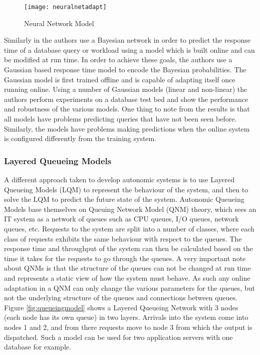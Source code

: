 \begin{figure}
	\centering
		\texttt{[image: neuralnetadapt]}
	\caption{Neural Network Model}
	\label{fig:neuralnet}
\end{figure}

Similarly in \cite{related:bayesiandb} the authors use a Bayesian network in order to predict the response time of a database query or workload using a model which is built online and can be modified at run time. In order to achieve these goals, the authors use a Gaussian based response time model to encode the Bayesian probabilities. The Gaussian model is first trained offline and is capable of adapting itself once running online. Using a number of Gaussian models (linear and non-linear) the authors perform experiments on a database test bed and show the performance and robustness of the various models. One thing to note from the results is that all models have problems predicting queries that have not been seen before. Similarly, the models have problems making predictions when the online system is configured differently from the training system. 

\subsubsection{Layered Queueing Models}

A different approach taken to develop autonomic systems is to use Layered Queueing Models (LQM) to represent the behaviour of the system, and then to solve the LQM to predict the future state of the system. Autonomic Queueing Models base themselves on Queuing Network Model (QNM) theory, which sees an IT system as a network of queues such as CPU queues, I/O queues, network queues, etc. Requests to the system are split into a number of classes, where each class of requests exhibits the same behaviour with respect to the queues. The response time and throughput of the system can then be calculated based on the time it takes for the requests to go through the queues. A very important note about QNMs is that the structure of the queues can not be changed at run time and represents a static view of how the system must behave. As such any online adaptation in a QNM can only change the various parameters for the queues, but not the underlying structure of the queues and connections between queues. Figure \ref{fig:queueingmodel} shows a Layered Queueing Network with 3 nodes (each node has its own queue) in two layers. Arrivals into the system come into nodes 1 and 2, and from there requests move to node 3 from which the output is dispatched. Such a model can be used for two application servers with one database for example.

